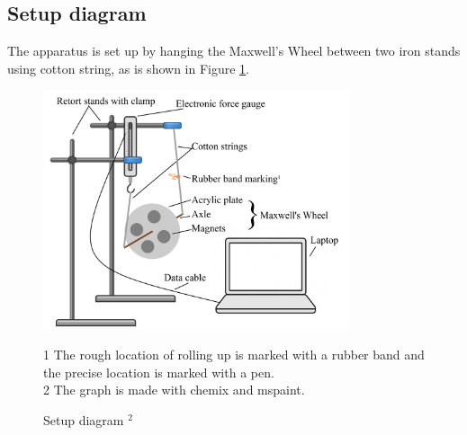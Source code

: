 \documentclass[a4paper]{article}
\begin{document}
\subsection{Setup diagram}

The apparatus is set up by hanging the Maxwell's Wheel between two iron stands using cotton string, as is shown in Figure \ref{fig.setup}.

\begin{figure}[ht]
    \centering
    \includegraphics[width = 0.8\textwidth]{setup.png}
    \caption{Setup diagram $^{2}$}
    \label{fig.setup}
    \begin{minipage}{0.8\textwidth}
    \begin{flushleft}
        \footnotesize{1 The rough location of rolling up is marked with a rubber band and the precise location is marked with a pen.} \\
        \footnotesize{2 The graph is made with chemix and mspaint.}
    \end{flushleft}
    \end{minipage}
    
\end{figure}
\end{document}
